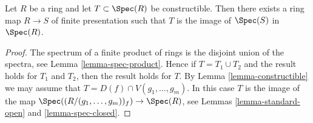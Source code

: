 \begin{lemma}
\label{lemma-constructible-is-image}
Let $R$ be a ring and let $T \subset \Spec(R)$
be constructible. Then there exists a ring map $R \to S$ of
finite presentation such that $T$ is the image of
$\Spec(S)$ in $\Spec(R)$.
\end{lemma}

\begin{proof}
The spectrum of a finite product of rings
is the disjoint union of the spectra, see
Lemma \ref{lemma-spec-product}. Hence if $T = T_1 \cup T_2$
and the result holds for $T_1$ and $T_2$, then the
result holds for $T$.
By Lemma \ref{lemma-constructible} we may assume
that $T = D(f) \cap V(g_1, \ldots, g_m)$.
In this case $T$ is the image of the map
$\Spec((R/(g_1, \ldots, g_m))_f) \to \Spec(R)$, see Lemmas
\ref{lemma-standard-open} and \ref{lemma-spec-closed}.
\end{proof}